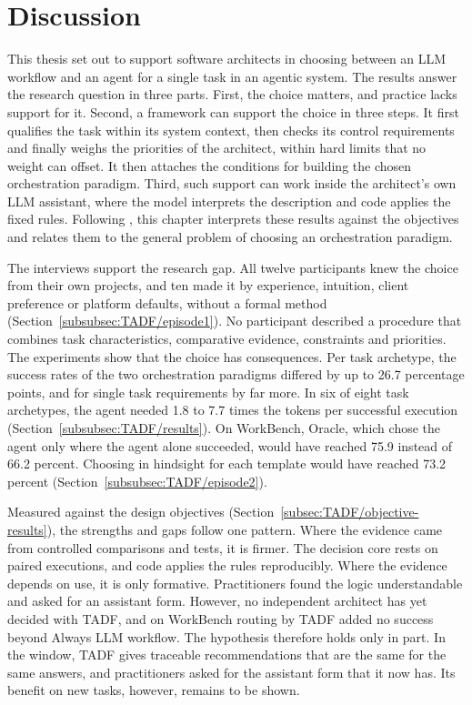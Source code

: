 \clearpage
\section{Discussion}
\label{sec:Discussion}

This thesis set out to support software architects in choosing between an LLM workflow and an agent for a single task in an agentic system. The results answer the research question in three parts. First, the choice matters, and practice lacks support for it. Second, a framework can support the choice in three steps. It first qualifies the task within its system context, then checks its control requirements and finally weighs the priorities of the architect, within hard limits that no weight can offset. It then attaches the conditions for building the chosen orchestration paradigm. Third, such support can work inside the architect's own LLM assistant, where the model interprets the description and code applies the fixed rules. Following \textcite{gregorPositioningPresentingDesign2013}, this chapter interprets these results against the objectives and relates them to the general problem of choosing an orchestration paradigm.

The interviews support the research gap. All twelve participants knew the choice from their own projects, and ten made it by experience, intuition, client preference or platform defaults, without a formal method (Section~\ref{subsubsec:TADF/episode1}). No participant described a procedure that combines task characteristics, comparative evidence, constraints and priorities. The experiments show that the choice has consequences. Per task archetype, the success rates of the two orchestration paradigms differed by up to 26.7 percentage points, and for single task requirements by far more. In six of eight task archetypes, the agent needed 1.8 to 7.7 times the tokens per successful execution (Section~\ref{subsubsec:TADF/results}). On WorkBench, Oracle, which chose the agent only where the agent alone succeeded, would have reached 75.9 instead of 66.2 percent. Choosing in hindsight for each template would have reached 73.2 percent (Section~\ref{subsubsec:TADF/episode2}).

Measured against the design objectives (Section~\ref{subsec:TADF/objective-results}), the strengths and gaps follow one pattern. Where the evidence came from controlled comparisons and tests, it is firmer. The decision core rests on paired executions, and code applies the rules reproducibly. Where the evidence depends on use, it is only formative. Practitioners found the logic understandable and asked for an assistant form. However, no independent architect has yet decided with TADF, and on WorkBench routing by TADF added no success beyond Always LLM workflow. The hypothesis therefore holds only in part. In the window, TADF gives traceable recommendations that are the same for the same answers, and practitioners asked for the assistant form that it now has. Its benefit on new tasks, however, remains to be shown.

